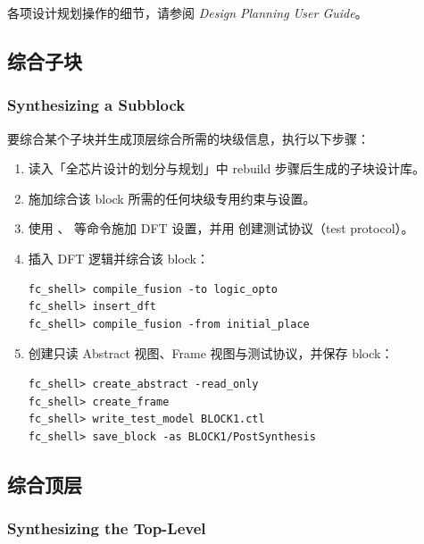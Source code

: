 \begin{noteBox}
各项设计规划操作的细节，请参阅 \textit{Design Planning User Guide}。
\end{noteBox}

\subsection{综合子块}
\subsubsection*{Synthesizing a Subblock}

要综合某个子块并生成顶层综合所需的块级信息，执行以下步骤：
\begin{enumerate}
  \item 读入「全芯片设计的划分与规划」中 rebuild 步骤后生成的子块设计库。
  \item 施加综合该 block 所需的任何块级专用约束与设置。
  \item 使用 、 等命令施加 DFT 设置，并用  创建测试协议（test protocol）。
  \item 插入 DFT 逻辑并综合该 block：
\begin{lstlisting}
fc_shell> compile_fusion -to logic_opto
fc_shell> insert_dft
fc_shell> compile_fusion -from initial_place
\end{lstlisting}
  \item 创建只读 Abstract 视图、Frame 视图与测试协议，并保存 block：
\begin{lstlisting}
fc_shell> create_abstract -read_only
fc_shell> create_frame
fc_shell> write_test_model BLOCK1.ctl
fc_shell> save_block -as BLOCK1/PostSynthesis
\end{lstlisting}
\end{enumerate}

\subsection{综合顶层}
\subsubsection*{Synthesizing the Top-Level}

